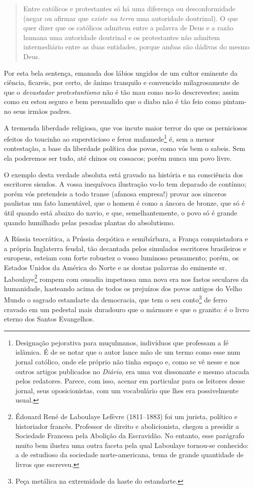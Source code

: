 \begin{quote}
Entre católicos e protestantes só há uma diferença ou desconformidade
(negar ou afirmar que \emph{existe na terra} uma autoridade doutrinal).
O que quer dizer que os católicos admitem entre a palavra de Deus e a
razão humana uma autoridade doutrinal e os protestantes não admitem
intermediário entre as duas entidades, porque ambas são dádivas do mesmo
Deus.
\end{quote}

Por esta bela sentença, emanada dos lábios ungidos de um cultor eminente
da ciência, ficareis, por certo, de ânimo tranquilo e convencido
milagrosamente de que o \emph{devastador protestantismo} não é tão mau
como no-lo descrevestes; assim como eu estou seguro e bem persuadido que
o diabo não é tão feio como pintam-no seus irmãos padres.

A tremenda liberdade religiosa, que vos incute maior terror do que os
perniciosos efeitos do toucinho ao supersticioso e feroz
mafamede\footnote{Designação pejorativa para muçulmanos, indivíduos
  que professam a fé islâmica. É de se notar que o autor lance mão de um
  termo como esse num jornal católico, onde ele próprio não tinha espaço
  e, como se vê nesse e nos outros artigos publicados no \emph{Diário},
  era uma voz dissonante e mesmo atacada pelos redatores. Parece, com
  isso, acenar em particular para os leitores desse jornal, seus
  oposicionistas, com um vocabulário que lhes era possivelmente usual.}
é, sem a menor contestação, a base da liberdade política dos povos, como
vós bem o sabeis. Sem ela poderemos ser tudo, até chinos ou cossacos;
porém nunca um povo livre.

O exemplo desta verdade absoluta está gravado na história e na
consciência dos escritores sisudos. A vossa inequívoca ilustração vo-lo
tem deparado de contínuo; porém vós pretendeis a todo transe (afanosa
empresa!) provar aos sinceros paulistas um fato lamentável, que o homem
é como a âncora de bronze, que só é útil quando está abaixo do navio, e
que, semelhantemente, o povo só é grande quando humilhado pelas pesadas
plantas do absolutismo.

A Rússia teocrática, a Prússia despótica e semibárbara, a França
conquistadora e a própria Inglaterra feudal, tão decantada pelos
simulados escritores brasileiros e europeus, esteiam com forte robustez
o vosso luminoso pensamento; porém, os Estados Unidos da América do
Norte e as doutas palavras do eminente sr.\,Laboulaye\footnote{Édouard
  René de Laboulaye Lefèvre (1811--1883) foi um jurista, político e
  historiador francês. Professor de direito e abolicionista, chegou a
  presidir a Sociedade Francesa pela Abolição da Escravidão. No entanto,
  esse parágrafo muito bem ilustra uma outra faceta pela qual Laboulaye
  tornou-se conhecido: a de estudioso da sociedade norte-americana, tema
  de grande quantidade de livros que escreveu.} rompem com ousadia
impetuosa uma nova era nos fastos seculares da humanidade, hasteando
acima de todos os prejuízos dos povos antigos do Velho Mundo o sagrado
estandarte da democracia, que tem o seu conto\footnote{Peça metálica
  na extremidade da haste do estandarte.} de ferro cravado em um
pedestal mais duradouro que o mármore e que o granito: é o livro eterno
dos Santos Evangelhos.

